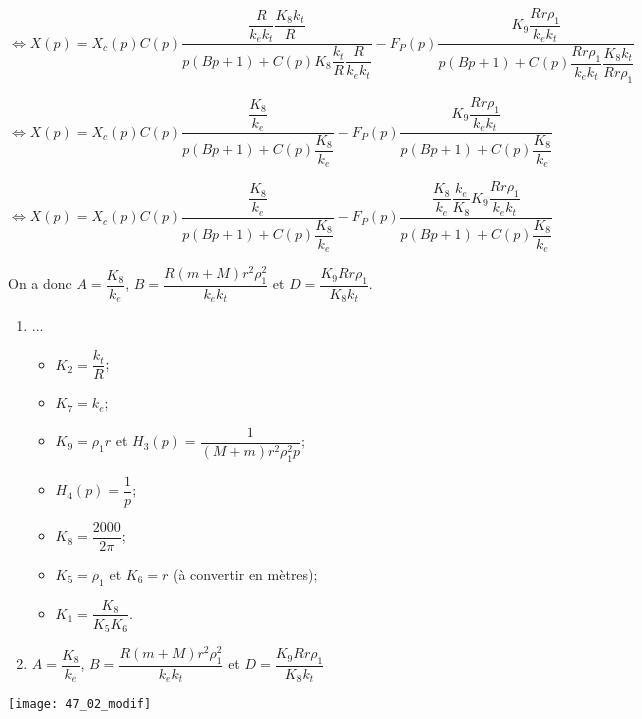 $\Leftrightarrow X(p)
=
X_c(p) C(p)\dfrac{
\dfrac{R}{k_ek_t}\dfrac{K_8k_t}{R}}{
p\left(B p +  1\right) 
 + C(p)K_8 \dfrac{k_t}{R} \dfrac{R}{k_ek_t}
 }
- F_P(p)\dfrac{K_9\dfrac{Rr\rho_1}{  k_ek_t}}{
p\left(
B  p
 + 1\right)
 + C(p)\dfrac{Rr\rho_1}{  k_ek_t}\dfrac{ K_8 k_t}{Rr\rho_1 } }
$

$\Leftrightarrow X(p)
=
X_c(p) C(p)\dfrac{
\dfrac{K_8}{k_e}}{
p\left(B p +  1\right) 
 + C(p) \dfrac{K_8 }{k_e}
 }
- F_P(p)\dfrac{K_9\dfrac{Rr\rho_1}{  k_ek_t}}{
p\left(
B  p
 + 1\right)
 + C(p)\dfrac{K_8}{  k_e} }
$



$\Leftrightarrow X(p)
=
X_c(p) C(p)\dfrac{
\dfrac{K_8}{k_e}}{
p\left(B p +  1\right) 
 + C(p) \dfrac{K_8 }{k_e}
 }
- F_P(p)\dfrac{ \dfrac{K_8}{  k_e} \dfrac{  k_e}{K_8}K_9\dfrac{Rr\rho_1}{  k_ek_t}}{
p\left(
B  p
 + 1\right)
 + C(p)\dfrac{K_8}{  k_e} }
$



On a donc $A=\dfrac{K_8}{k_e}$, $B=\dfrac{R\left(m+M\right)r^2\rho_1^2}{k_ek_t}$ et 
$D = \dfrac{ K_9 Rr\rho_1}{  K_8k_t}$.
\else
\fi

\ifprof
\else
\ifcolle
\else
\begin{solution}
\begin{enumerate}
\item ...
\begin{itemize}
\item $K_2 = \dfrac{k_t}{R}$;
\item $K_7 = k_e$;
\item $K_9 = \rho_1 r$ et $H_3(p)=\dfrac{1}{\left(M+m\right)r^2\rho_1^2 p}$;
\item $H_4(p)=\dfrac{1}{p}$; 
\item $K_8  = \dfrac{2000}{2\pi}$;
\item $K_5=\rho_1$ et $K_6=r$ (à convertir en mètres);
\item $K_1 =\dfrac{K_8}{K_5 K_6}$.
\end{itemize}
\item $A=\dfrac{K_8}{k_e}$, $B=\dfrac{R\left(m+M\right)r^2\rho_1^2}{k_ek_t}$ et 
$D = \dfrac{ K_9 Rr\rho_1}{  K_8k_t}$
\end{enumerate}
\end{solution}
\fi
\begin{marginfigure}
\centering
\texttt{[image: 47\_02\_modif]}
\end{marginfigure}
\fi



\ifprof
\else


\fi